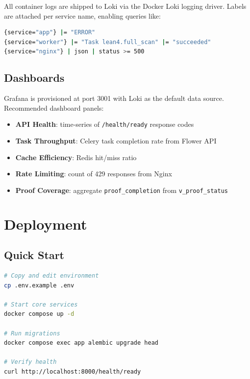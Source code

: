 \documentclass[11pt,a4paper]{article}
\begin{document}
All container logs are shipped to Loki via the Docker Loki logging driver.
Labels are attached per service name, enabling queries like:

\begin{lstlisting}[language=bash, caption={LogQL examples}]
{service="app"} |= "ERROR"
{service="worker"} |= "Task lean4.full_scan" |= "succeeded"
{service="nginx"} | json | status >= 500
\end{lstlisting}

\subsection{Dashboards}

Grafana is provisioned at port 3001 with Loki as the default data source.
Recommended dashboard panels:

\begin{itemize}
  \item \textbf{API Health}: time-series of \texttt{/health/ready} response codes
  \item \textbf{Task Throughput}: Celery task completion rate from Flower API
  \item \textbf{Cache Efficiency}: Redis hit/miss ratio
  \item \textbf{Rate Limiting}: count of 429 responses from Nginx
  \item \textbf{Proof Coverage}: aggregate \texttt{proof\_completion} from
        \texttt{v\_proof\_status}
\end{itemize}

\section{Deployment}

\subsection{Quick Start}

\begin{lstlisting}[language=bash, caption={Core stack startup}]
# Copy and edit environment
cp .env.example .env

# Start core services
docker compose up -d

# Run migrations
docker compose exec app alembic upgrade head

# Verify health
curl http://localhost:8000/health/ready
\end{lstlisting}
\end{document}
